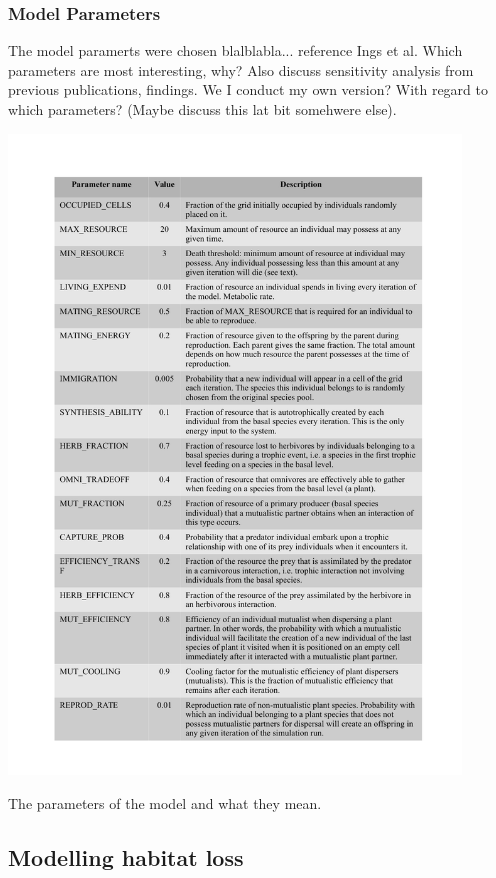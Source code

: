 \subsubsection{Model Parameters}
\label{sec:parameters}

The model paramerts were chosen blalblabla... reference Ings et al. Which parameters are most interesting, why? Also discuss sensitivity analysis from previous publications, findings. We I conduct my own version? With regard to which parameters? (Maybe discuss this lat bit somehwere else).

\begin{table}[hp!]
\centering
\includegraphics[width=0.9\textwidth]{"tables/IBM_parameters"}
\caption{The parameters of the model and what they mean.}
\label{tab:IBM_parameters}
\end{table}

\subsection{Modelling habitat loss}
\label{sec:model_HL}

